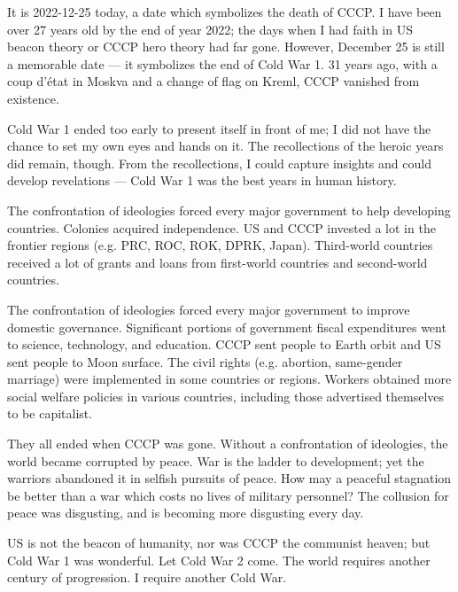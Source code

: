 
\begin{multicols*}{2}
    
It is 2022-12-25 today, a date which symbolizes the death of CCCP.
I have been over 27 years old by the end of year 2022;
the days when I had faith in US beacon theory or CCCP hero theory had far gone.
However, December 25 is still a memorable date --- it symbolizes the end of Cold War 1.
31 years ago, with a coup d'\'etat in Moskva and a change of flag on Kreml, CCCP vanished from existence.

Cold War 1 ended too early to present itself in front of me;
I did not have the chance to set my own eyes and hands on it.
The recollections of the heroic years did remain, though.
From the recollections, I could capture insights and could develop revelations ---
Cold War 1 was the best years in human history.

The confrontation of ideologies forced every major government to help developing countries.
Colonies acquired independence.
US and CCCP invested a lot in the frontier regions (e.g. PRC, ROC, ROK, DPRK, Japan).
Third-world countries received a lot of grants and loans from first-world countries and second-world countries.

The confrontation of ideologies forced every major government to improve domestic governance.
Significant portions of government fiscal expenditures went to science, technology, and education.
CCCP sent people to Earth orbit and US sent people to Moon surface.
The civil rights (e.g. abortion, same-gender marriage) were implemented in some countries or regions.
Workers obtained more social welfare policies in various countries, including those advertised themselves to be capitalist.

They all ended when CCCP was gone.
Without a confrontation of ideologies, the world became corrupted by peace.
War is the ladder to development; yet the warriors abandoned it in selfish pursuits of peace.
How may a peaceful stagnation be better than a war which costs no lives of military personnel?
The collusion for peace was disgusting, and is becoming more disgusting every day.

US is not the beacon of humanity, nor was CCCP the communist heaven; but Cold War 1 was wonderful.
Let Cold War 2 come.
The world requires another century of progression.
I require another Cold War.


\end{multicols*}
